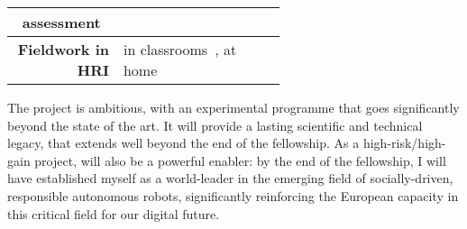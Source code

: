 \begin{table}[h]
\begin{tabular}{rp{0.6\linewidth}}
        assessment~\cite{lemaignan2018underworlds,sallami2019simulation} \\
        \midrule
        \textbf{Fieldwork in HRI} & \small in
        classrooms~\cite{hood2015when, lemaignan2016learning, jacq2016building,
        baxter2015wider,kennedy2016cautious,senft2018robots}, at home~\cite{mondada2015ranger}\\
        \bottomrule
    \end{tabular}
    \label{pi-expertise}
\end{table}

The project is ambitious, with an experimental programme that goes significantly
beyond the state of the art. It will provide a lasting scientific and
technical legacy, that extends well beyond the end of the fellowship. As a
high-risk/high-gain project, \project will also be a powerful enabler: by the
end of the fellowship, I will have established myself as a world-leader in the
emerging field of socially-driven, responsible autonomous robots, significantly
reinforcing the European capacity in this critical field for our digital future.



\newpage

\printbibliography



